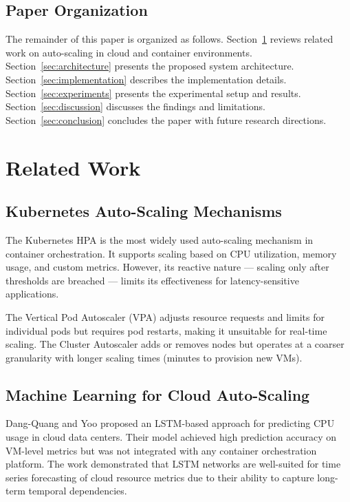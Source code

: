 \documentclass[journal]{IEEEtran}
\begin{document}
\subsection{Paper Organization}
The remainder of this paper is organized as follows. Section~\ref{sec:related} reviews related work on auto-scaling in cloud and container environments. Section~\ref{sec:architecture} presents the proposed system architecture. Section~\ref{sec:implementation} describes the implementation details. Section~\ref{sec:experiments} presents the experimental setup and results. Section~\ref{sec:discussion} discusses the findings and limitations. Section~\ref{sec:conclusion} concludes the paper with future research directions.

\section{Related Work}
\label{sec:related}

\subsection{Kubernetes Auto-Scaling Mechanisms}
The Kubernetes HPA \cite{k8shpa} is the most widely used auto-scaling mechanism in container orchestration. It supports scaling based on CPU utilization, memory usage, and custom metrics. However, its reactive nature --- scaling only after thresholds are breached --- limits its effectiveness for latency-sensitive applications.

The Vertical Pod Autoscaler (VPA) adjusts resource requests and limits for individual pods but requires pod restarts, making it unsuitable for real-time scaling. The Cluster Autoscaler adds or removes nodes but operates at a coarser granularity with longer scaling times (minutes to provision new VMs).

\subsection{Machine Learning for Cloud Auto-Scaling}
Dang-Quang and Yoo \cite{dangquang2021} proposed an LSTM-based approach for predicting CPU usage in cloud data centers. Their model achieved high prediction accuracy on VM-level metrics but was not integrated with any container orchestration platform. The work demonstrated that LSTM networks are well-suited for time series forecasting of cloud resource metrics due to their ability to capture long-term temporal dependencies.
\end{document}

